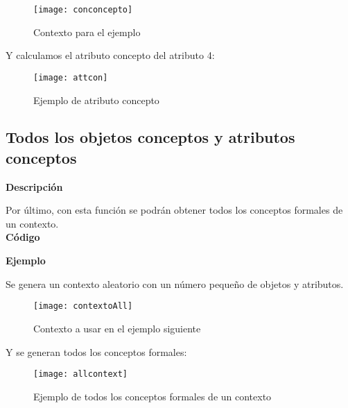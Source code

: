         \begin{figure}[H]
            \centering
            \texttt{[image: conconcepto]}
            \caption{Contexto para el ejemplo}
            \label{fig:conconcepto}
        \end{figure}

        Y calculamos el atributo concepto del atributo 4:

        \begin{figure}[H]
            \centering
            \texttt{[image: attcon]}
            \caption{Ejemplo de atributo concepto}
            \label{fig:attcon}
        \end{figure}



    \subsection{Todos los objetos conceptos y atributos conceptos}
       
        
        \textbf{Descripci\'on}

        Por \'ultimo, con esta funci\'on se podr\'an obtener todos los conceptos formales de un contexto.
        \\


        \textbf{C\'odigo}

        

        \bigskip

        \textbf{Ejemplo}

        Se genera un contexto aleatorio con un n\'umero peque\~no de objetos y atributos.

        \begin{figure}[H]
            \centering
            \texttt{[image: contextoAll]}
            \caption{Contexto a usar en el ejemplo siguiente}
            \label{fig:contextoAll}
        \end{figure}
        
        \bigskip
        Y se generan todos los conceptos formales:


        \begin{figure}[H]
            \centering
            \texttt{[image: allcontext]}
            \caption{Ejemplo de todos los conceptos formales de un contexto}
            \label{fig:allcontext}
        \end{figure}

        \clearpage



